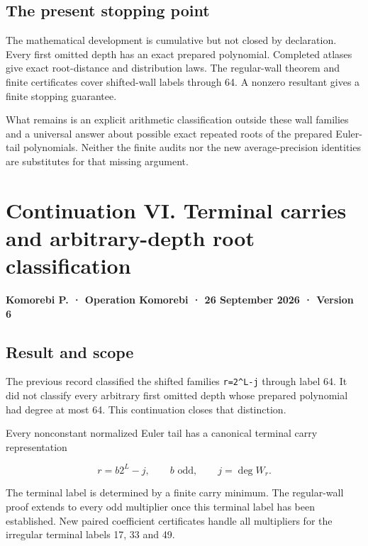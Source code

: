 \documentclass[11pt,letterpaper]{article}
\begin{document}
\subsection{The present stopping point}\label{the-present-stopping-point}

The mathematical development is cumulative but not closed by declaration. Every first omitted depth has an exact prepared polynomial. Completed atlases give exact root-distance and distribution laws. The regular-wall theorem and finite certificates cover shifted-wall labels through 64. A nonzero resultant gives a finite stopping guarantee.

What remains is an explicit arithmetic classification outside these wall families and a universal answer about possible exact repeated roots of the prepared Euler-tail polynomials. Neither the finite audits nor the new average-precision identities are substitutes for that missing argument.

\clearpage

\section{Continuation VI. Terminal carries and arbitrary-depth root classification}\label{continuation-vi.-terminal-carries-and-arbitrary-depth-root-classification}

\textbf{Komorebi P. · Operation Komorebi · 26 September 2026 · Version 6}

\subsection{Result and scope}\label{result-and-scope}

The previous record classified the shifted families \texttt{r=2\^{}L-j} through label 64. It did not classify every arbitrary first omitted depth whose prepared polynomial had degree at most 64. This continuation closes that distinction.

Every nonconstant normalized Euler tail has a canonical terminal carry representation

\[
\boxed{r=b2^L-j,\qquad b\text{ odd},\qquad j=\deg W_r.} \tag{VI.1}
\]

The terminal label is determined by a finite carry minimum. The regular-wall proof extends to every odd multiplier once this terminal label has been established. New paired coefficient certificates handle all multipliers for the irregular terminal labels 17, 33 and 49.
\end{document}
